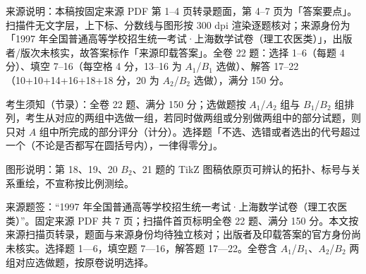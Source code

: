 

\begin{gktip}
来源说明：本稿按固定来源 PDF 第 1–4 页转录题面，第 4–7 页为「答案要点」。扫描件无文字层，上下标、分数线与图形按 300 dpi 渲染逐题核对；来源身份为「1997 年全国普通高等学校招生统一考试·上海数学试卷（理工农医类）」，出版者/版次未核实，故答案标作「来源印载答案」。全卷 22 题：选择 1–6（每题 4 分）、填空 7–16（每空格 4 分，13–16 为 $A_1$/$B_1$ 选做）、解答 17–22（10+10+14+16+18+18 分，20 为 $A_2$/$B_2$ 选做），满分 150 分。

考生须知（节录）：全卷 22 题、满分 150 分；选做题按 $A_1$/$A_2$ 组与 $B_1$/$B_2$ 组排列，考生从对应的两组中选做一组，若同时做两组或分别做两组中的部分试题，则只对 $A$ 组中所完成的部分评分（计分）。选择题「不选、选错或者选出的代号超过一个（不论是否都写在圆括号内），一律得零分」。

图形说明：第 18、19、20 $B_2$、21 题的 TikZ 图稿依原页可辨认的拓扑、标号与关系重绘，不宣称按比例测绘。
\end{gktip}

来源题签：“1997 年全国普通高等学校招生统一考试·上海数学试卷（理工农医类）”。固定来源 PDF 共 7 页；扫描件首页标明全卷 22 题、满分 150 分。本文按来源扫描页转录，题面与来源身份均待独立核对；出版者及印载答案的官方身份尚未核实。选择题 1—6，填空题 7—16，解答题 17—22。全卷含 $A_1$/$B_1$、$A_2$/$B_2$ 两组对应选做题，按原卷说明选择。


